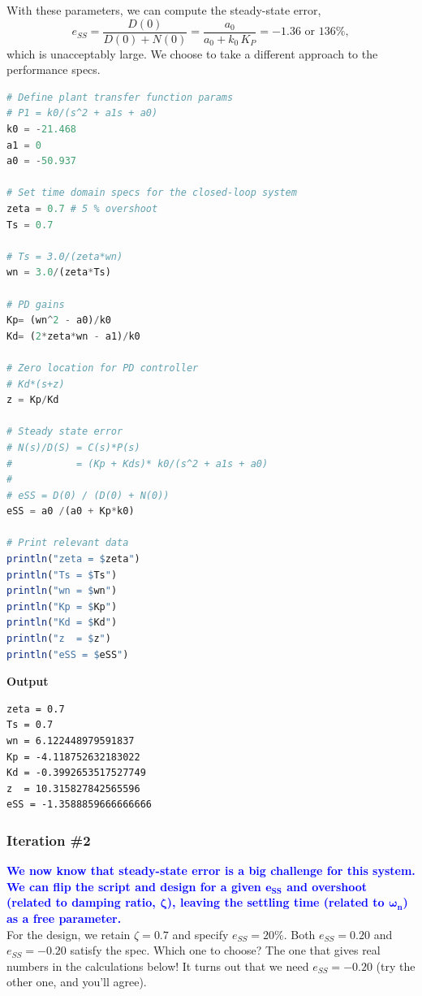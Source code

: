 With these parameters, we can compute the steady-state error, 
$$e_{SS} = \frac{D(0)}{D(0) + N(0)} = \frac{a_0}{a_0 + k_0 \, K_P} = -1.36 \text{ or } 136\%,$$
which is unacceptably large. We choose to take a different approach to the performance specs. \\

\begin{lstlisting}[language=Julia,style=mystyle]
# Define plant transfer function params 
# P1 = k0/(s^2 + a1s + a0)
k0 = -21.468
a1 = 0
a0 = -50.937

# Set time domain specs for the closed-loop system
zeta = 0.7 # 5 % overshoot
Ts = 0.7

# Ts = 3.0/(zeta*wn)
wn = 3.0/(zeta*Ts)

# PD gains
Kp= (wn^2 - a0)/k0
Kd= (2*zeta*wn - a1)/k0 

# Zero location for PD controller
# Kd*(s+z)
z = Kp/Kd

# Steady state error
# N(s)/D(S) = C(s)*P(s) 
#           = (Kp + Kds)* k0/(s^2 + a1s + a0)
#
# eSS = D(0) / (D(0) + N(0))
eSS = a0 /(a0 + Kp*k0)

# Print relevant data
println("zeta = $zeta")
println("Ts = $Ts")
println("wn = $wn")
println("Kp = $Kp")
println("Kd = $Kd")
println("z  = $z")
println("eSS = $eSS")
\end{lstlisting}
\textbf{Output} 
\begin{verbatim}
zeta = 0.7
Ts = 0.7
wn = 6.122448979591837
Kp = -4.118752632183022
Kd = -0.3992653517527749
z  = 10.315827842565596
eSS = -1.3588859666666666
\end{verbatim}

\subsubsection{Iteration \#2}

\textcolor{blue}{\bf We now know that steady-state error is a big challenge for this system. We can flip the script and design for a given $\bm{e_{SS}}$ and overshoot (related to damping ratio, $\bm{\zeta}$), leaving the settling time (related to $\bm{\omega_n}$) as a free parameter. }\\

For the design, we retain $\zeta = 0.7$ and specify $e_{SS} = 20\%$. Both $e_{SS} = 0.20$ and $e_{SS} = -0.20$ satisfy the spec. Which one to choose? The one that gives real numbers in the calculations below! It turns out that we need $e_{SS} = -0.20$ (try the other one, and you'll agree).

